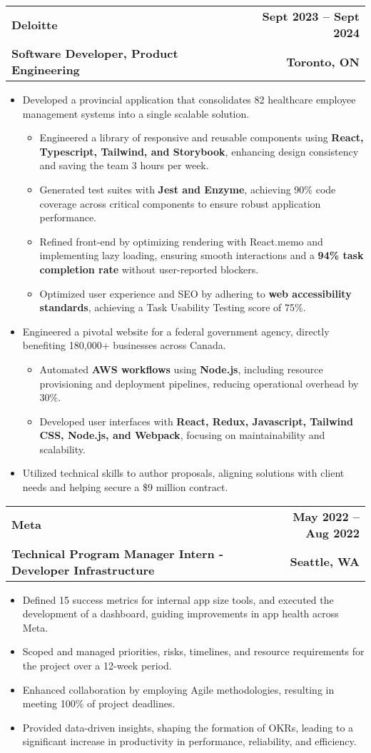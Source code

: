 \documentclass[letterpaper,11pt]{article}
\makeatletter
\newcommand{\resumeItem}[1]{
  \item\small{
    {#1 \vspace{-2pt}}
  }
}
\newcommand{\resumeSubheading}[4]{
  \vspace{-2pt}\item
    \begin{tabular*}{1.0\textwidth}[t]{l@{\extracolsep{\fill}}r}
      \textbf{#1} & \textbf{\small #2} \\
      \textbf{\small #3} & \textbf{\small #4} \\
    \end{tabular*}\vspace{-7pt}
}
\newcommand{\resumeItemListStart}{\begin{itemize}}
\newcommand{\resumeItemListEnd}{\end{itemize}\vspace{-5pt}}
\makeatother
\begin{document}
\resumeSubheading
{Deloitte}{Sept 2023 -- Sept 2024}
{Software Developer, Product Engineering}{Toronto, ON}
\resumeItemListStart
\resumeItem{Developed a provincial application that consolidates 82 healthcare employee management systems into a single scalable solution.
  \begin{itemize}
     \item{Engineered a library of responsive and reusable components using \textbf{React, Typescript, Tailwind, and Storybook}, enhancing design consistency and saving the team 3 hours per week.}
    \item{Generated test suites with \textbf{Jest and Enzyme}, achieving 90\% code coverage across critical components to ensure robust application performance.}
    \item{Refined front-end by optimizing rendering with React.memo and implementing lazy loading, ensuring smooth interactions and a \textbf{94\% task completion rate} without user-reported blockers.}
    \item{Optimized user experience and SEO by adhering to \textbf{web accessibility standards}, achieving a Task Usability Testing score of 75\%.}
    
  \end{itemize}
}
\resumeItem{Engineered a pivotal website for a federal government agency, directly benefiting 180,000+ businesses across Canada.}
\begin{itemize}
    \item{Automated \textbf{AWS workflows} using \textbf{Node.js}, including resource provisioning and deployment pipelines, reducing operational overhead by 30\%.}
    \item{Developed user interfaces with \textbf{React, Redux, Javascript, Tailwind CSS, Node.js, and Webpack}, focusing on maintainability and scalability.}

\end{itemize}
\resumeItem{Utilized technical skills to author proposals, aligning solutions with client needs and helping secure a \$9 million contract.}

\resumeItemListEnd

\resumeSubheading
{Meta}{May 2022 -- Aug 2022}
{Technical Program Manager Intern - Developer Infrastructure}{Seattle, WA}
\resumeItemListStart
\resumeItem{Defined 15 success metrics for internal app size tools, and executed the development of a dashboard, guiding improvements in app health across Meta.}
\resumeItem{Scoped and managed priorities, risks, timelines, and resource requirements for the project over a 12-week period.}
\resumeItem{Enhanced collaboration by employing Agile methodologies, resulting in meeting 100\% of project deadlines.}
\resumeItem{Provided data-driven insights, shaping the formation of OKRs, leading to a significant increase in productivity in performance, reliability, and efficiency.}
\resumeItemListEnd
\end{document}
